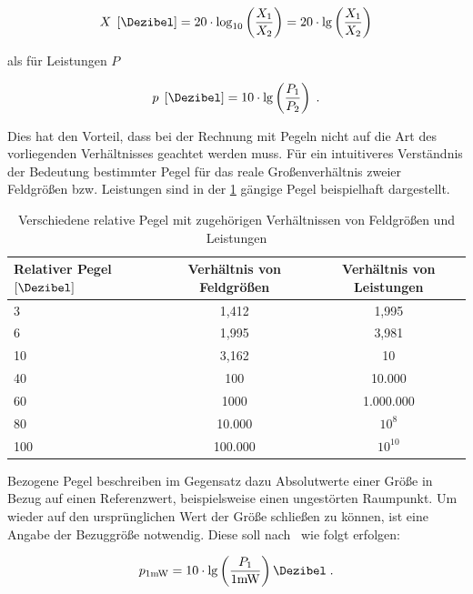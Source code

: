 \begin{equation}
    X \; \left[\si{\Dezibel}\right] = 20 \cdot \log_{10} \left( \frac{X_1}{X_2} \right) = 20 \cdot \lg \left( \frac{X_1}{X_2} \right)
\end{equation}

als für Leistungen $P$

\begin{equation}
    p \; \left[\si{\Dezibel}\right] = 10 \cdot \lg \left( \frac{P_1}{P_2} \right) \; .
\end{equation}

Dies hat den Vorteil, dass bei der Rechnung mit Pegeln nicht auf die Art des vorliegenden Verhältnisses geachtet werden muss. Für ein intuitiveres Verständnis der Bedeutung bestimmter Pegel für das reale Großenverhältnis zweier Feldgrößen bzw. Leistungen sind in der \Tabelle\ref{tab:2_Relative_Pegel} gängige Pegel beispielhaft dargestellt.

\begin{table}
\renewcommand{\arraystretch}{\tablestretch}
\centering
\caption{Verschiedene relative Pegel mit zugehörigen Verhältnissen von Feldgrößen und Leistungen}
\vspace{\tablespace}
\begin{tabular}{l c c}
    \toprule
    Relativer Pegel $\left[\si{\Dezibel}\right]$ & Verhältnis von Feldgrößen & Verhältnis von Leistungen \\
    \midrule
    3   &   1,412   &   1,995   \\
    6   &   1,995   &   3,981   \\
    10  &   3,162   &   10      \\
    40  &   100     &   10.000  \\
    60  &   1000    &   1.000.000 \\
    80  &   10.000  &   $10^8$  \\
    100 &   100.000  &   $10^{10}$ \\
    \bottomrule
\end{tabular}
\label{tab:2_Relative_Pegel}
\end{table}

Bezogene Pegel beschreiben im Gegensatz dazu Absolutwerte einer Größe in Bezug auf einen Referenzwert, beispielsweise einen ungestörten Raumpunkt. Um wieder auf den ursprünglichen Wert der Größe schließen zu können, ist eine Angabe der Bezuggröße notwendig. Diese soll nach~\cite{IEC60027-3} wie folgt erfolgen: 

\begin{equation}
    p_{1 \si{\milli\watt}} = 10 \cdot \lg \left( \frac{P_1}{1 \si{\milli\watt}}\right) \si{\Dezibel} \; .
\end{equation}

